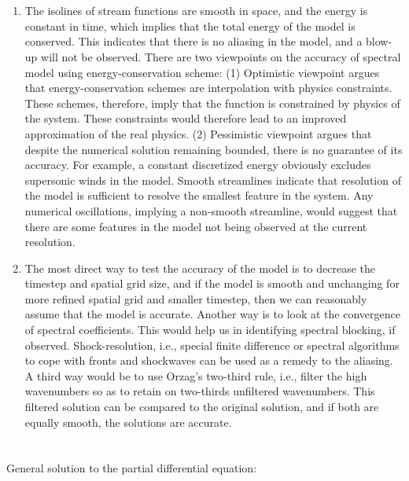 \documentclass{article}
\begin{document}
\section{}
\begin{enumerate}
    \item The isolines of stream functions are smooth in space, and the energy is constant in time, which implies that the total energy of the model is conserved. This indicates that there is no aliasing in the model, and a blow-up will not be observed. There are two viewpoints on the accuracy of spectral model using energy-conservation scheme: (1) Optimistic viewpoint argues that energy-conservation schemes are interpolation with physics constraints. These schemes, therefore, imply that the function is constrained by physics of the system. These constraints would therefore lead to an improved approximation of the real physics. (2) Pessimistic viewpoint argues that despite the numerical solution remaining bounded, there is no guarantee of its accuracy. For example, a constant discretized energy obviously excludes supersonic winds in the model. Smooth streamlines indicate that resolution of the model is sufficient to resolve the smallest feature in the system. Any numerical oscillations, implying a non-smooth streamline, would suggest that there are some features in the model not being observed at the current resolution.
    
    \item The most direct way to test the accuracy of the model is to decrease the timestep and spatial grid size, and if the model is smooth and unchanging for more refined spatial grid and smaller timestep, then we can reasonably assume that the model is accurate.  Another  way is to look at the convergence of spectral coefficients. This would help us in identifying spectral blocking, if observed. Shock-resolution, i.e., special finite difference or spectral algorithms to cope with fronts and shockwaves can be used as a remedy to the aliasing. A third way would be to use Orzag's two-third rule, i.e., filter the high wavenumbers so as to retain on two-thirds unfiltered wavenumbers. This filtered solution can be compared to the original solution, and if both are equally smooth, the solutions are accurate.
\end{enumerate}

\section{}
General solution to the partial differential equation:
\end{document}
